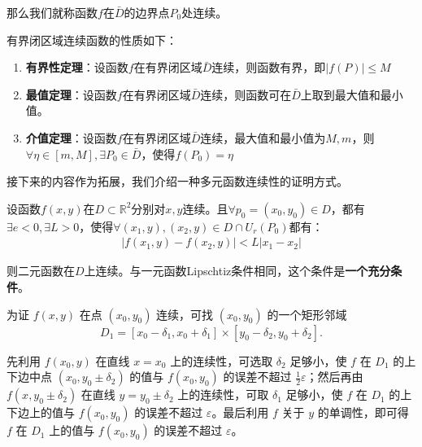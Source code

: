 \documentclass{ctexart}
\let\oldtextbf\textbf %
\renewcommand{\textbf}[1]{\textcolor{btex}{\oldtextbf{#1}}} %
\begin{document}
那么我们就称函数$f$在$\bar{D}$的边界点$P_0$处连续。
\begin{tcolorbox}[
    colback=bac1,     %
    colframe=fra1,   %
    coltitle=white,             %
    coltext=tex1,
    title=有界闭区域连续函数的性质,
    fonttitle=\bfseries,        %
arc=3mm,                     %
breakable
]
有界闭区域连续函数的性质如下：
\begin{enumerate}
    \item \textbf{有界性定理}：设函数$f$在有界闭区域$\bar{D}$连续，则函数有界，即$|f(P)|\leq M$
    \item \textbf{最值定理}：设函数$f$在有界闭区域$\bar{D}$连续，则函数可在$\bar{D}$上取到最大值和最小值。
    \item \textbf{介值定理}：设函数$f$在有界闭区域$\bar{D}$连续，最大值和最小值为$M,m$，则$\forall \eta\in[m,M],\exists P_0\in\bar{D} $，使得$f(P_0)=\eta$
\end{enumerate}
\end{tcolorbox}

接下来的内容作为拓展，我们介绍一种多元函数连续性的证明方式。
\begin{tcolorbox}[
    colback=bac1,     %
    colframe=fra1,   %
    coltitle=white,             %
    coltext=tex1,
    title=多元函数连续的Lipschitz条件,
    fonttitle=\bfseries,        %
arc=3mm,                     %
breakable
]
设函数$f(x,y)$在$D\subset \mathbb{R}^2$分别对$x,y$连续。且$\forall p_0=(x_0,y_0)\in D$，都有$\exists e<0,\exists L>0$，使得$\forall (x_1,y),(x_2,y)\in D\cap U_r(P_0)$都有：
\begin{align*}
    |f(x_1,y)-f(x_2,y)|<L|x_1-x_2|\tag{7-3}
\end{align*}

则二元函数在$D$上连续。与一元函数Lipschtiz条件相同，这个条件是\textbf{一个充分条件}。
\end{tcolorbox}

为证 \( f(x, y) \) 在点 \( (x_0, y_0) \) 连续，可找 \( (x_0, y_0) \) 的一个矩形邻域 
    \[
    D_1 = [x_0 - \delta_1, x_0 + \delta_1] \times [y_0 - \delta_2, y_0 + \delta_2].
    \]
    
    先利用 \( f(x_0, y) \) 在直线 \( x = x_0 \) 上的连续性，可选取 \( \delta_2 \) 足够小，使 \( f \) 在 \( D_1 \) 的上下边中点 \( (x_0, y_0 \pm \delta_2) \) 的值与 \( f(x_0, y_0) \) 的误差不超过 \( \frac{1}{2} \varepsilon \)；然后再由 \( f(x, y_0 \pm \delta_2) \) 在直线 \( y = y_0 \pm \delta_2 \) 上的连续性，可取 \( \delta_1 \) 足够小，使 \( f \) 在 \( D_1 \) 的上下边上的值与 \( f(x_0, y_0) \) 的误差不超过 \( \varepsilon \)。最后利用 \( f \) 关于 \( y \) 的单调性，即可得 \( f \) 在 \( D_1 \) 上的值与 \( f(x_0, y_0) \) 的误差不超过 \( \varepsilon \)。
\end{document}
